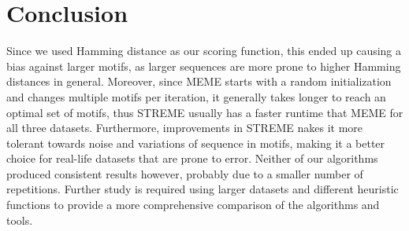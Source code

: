 \section{Conclusion}

Since we used Hamming distance as our scoring function, this ended up causing a bias against larger motifs, as larger sequences are more prone to higher Hamming distances in general. Moreover, since MEME starts with a random initialization and changes multiple motifs per iteration, it generally takes longer to reach an optimal set of motifs, thus STREME usually has a faster runtime that MEME for all three datasets. Furthermore, improvements in STREME nakes it more tolerant towards noise and variations of sequence in motifs, making it a better choice for real-life datasets that are prone to error. Neither of our algorithms produced consistent results however, probably due to a smaller number of repetitions. Further study is required using larger datasets and different heuristic functions to provide a more comprehensive comparison of the algorithms and tools.